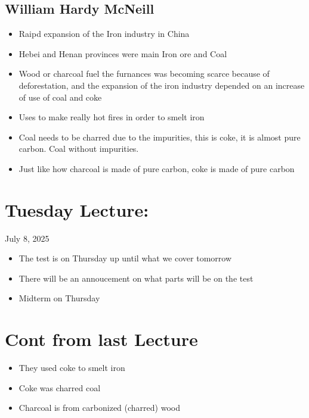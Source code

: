 \documentclass{article}
\begin{document}
\subsection{William Hardy McNeill}
\begin{itemize}
  \item Raipd expansion of the Iron industry in China
  \item Hebei and Henan provinces were main Iron ore and Coal
  \item Wood or charcoal fuel the furnances was becoming scarce because of deforestation,
    and the expansion of the iron industry
    depended on an increase of use of coal and coke
  \item Uses to make really hot fires in order to smelt iron
  \item Coal needs to be charred due to the impurities, this is coke, it is almost pure
    carbon. Coal without impurities.
  \item Just like how charcoal is made of pure carbon, coke is made of pure carbon
\end{itemize}

\newpage
\section*{Tuesday Lecture:}
July 8, 2025

\begin{itemize}
  \item The test is on Thursday up until what we cover tomorrow
  \item There will be an annoucement on what parts will be on the test
  \item Midterm on Thursday
\end{itemize}


\section*{Cont from last Lecture}
\begin{itemize}
  \item They used coke to smelt iron
  \item Coke was charred coal
  \item Charcoal is from carbonized (charred) wood
\end{itemize}
\end{document}
